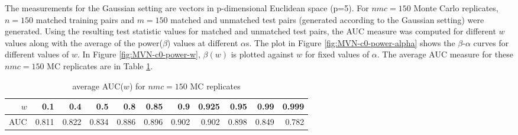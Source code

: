 \documentclass[12pt]{article} %
\begin{document}

	


 The measurements for the Gaussian setting are vectors in p-dimensional Euclidean space (p=5). For $nmc=150$ Monte Carlo replicates,  $n=150$ matched training pairs and $m=150$ matched and unmatched test pairs (generated according to the Gaussian setting) were generated. Using the resulting test statistic values for matched and unmatched test pairs, the AUC measure was computed for different $w$ values along with the average of the power($\beta$) values at  different $\alpha$s. The plot in Figure \ref{fig:MVN-c0-power-alpha} shows the  $\beta$-$\alpha$ curves for different values of  $w$. In Figure
 \ref{fig:MVN-c0-power-w},  $\beta(w)$ is plotted against $w$ for fixed values of $\alpha$.  
The average AUC measure for these $nmc=150$ MC replicates are  in  Table \ref{tab:AUCW}.

\begin{table}[h]
\centering
\begin{tabular}{rrrrrrrrrrr}
  \hline
$w$ & 0.1 & 0.4 & 0.5 & 0.8 & 0.85 & 0.9 & 0.925 & 0.95 & 0.99 & 0.999 \\ 
  \hline
AUC & 0.811 & 0.822 & 0.834 & 0.886 & 0.896 & 0.902 & 0.902 & 0.898 & 0.849 & 0.782 \\ 
   \hline
\end{tabular}
\caption{average AUC($w$) for $nmc=150$ MC replicates}
	\label{tab:AUCW}
\end{table}
\end{document}
